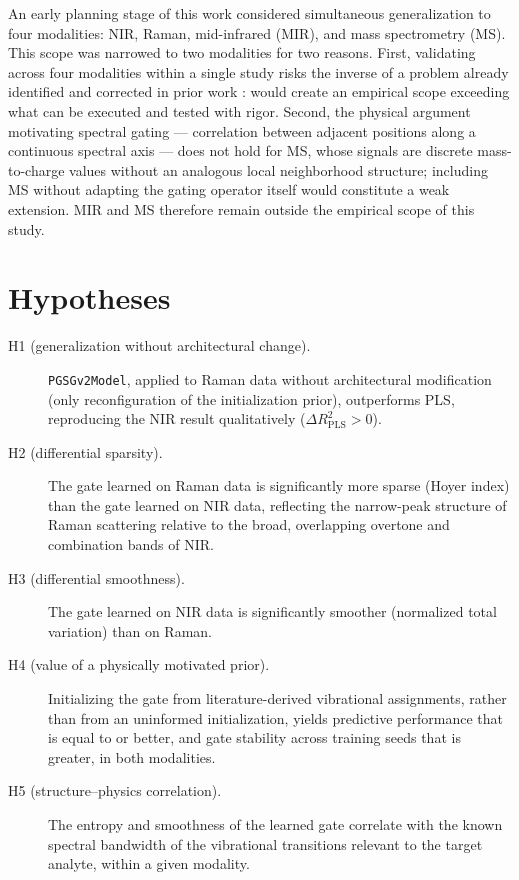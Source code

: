 \documentclass[preprint,12pt]{elsarticle}
\providecommand{\DIFaddtex}[1]{{\protect\color{blue} \sf #1}} %
\providecommand{\DIFdeltex}[1]{{\protect\color{red} \scriptsize #1}} %
\providecommand{\DIFaddbegin}{} %
\providecommand{\DIFaddend}{} %
\providecommand{\DIFdelbegin}{} %
\providecommand{\DIFdelend}{} %
\providecommand{\DIFadd}[1]{\texorpdfstring{\DIFaddtex{#1}}{#1}} %
\providecommand{\DIFdel}[1]{\texorpdfstring{\DIFdeltex{#1}}{}} %
\providecommand{\DIFscaledelfig}{0.5}
\newlength{\DIFdelgraphicswidth} %
\newlength{\DIFdelgraphicsheight} %
\providecommand{\DIFaddincludegraphics}[2][]{{\color{blue}\fbox{\DIFOincludegraphics[#1]{#2}}}} %
\providecommand{\DIFdelincludegraphics}[2][]{%
\sbox{\DIFdelgraphicsbox}{\DIFOincludegraphics[#1]{#2}}%
\settoboxwidth{\DIFdelgraphicswidth}{\DIFdelgraphicsbox} %
\settoboxtotalheight{\DIFdelgraphicsheight}{\DIFdelgraphicsbox} %
\scalebox{\DIFscaledelfig}{%
\parbox[b]{\DIFdelgraphicswidth}{\usebox{\DIFdelgraphicsbox}\\[-\baselineskip] \rule{\DIFdelgraphicswidth}{0em}}\llap{\resizebox{\DIFdelgraphicswidth}{\DIFdelgraphicsheight}{%
\setlength{\unitlength}{\DIFdelgraphicswidth}%
\begin{picture}(1,1)%
\thicklines\linethickness{2pt} %
{\color[rgb]{1,0,0}\put(0,0){\framebox(1,1){}}}%
{\color[rgb]{1,0,0}\put(0,0){\line( 1,1){1}}}%
{\color[rgb]{1,0,0}\put(0,1){\line(1,-1){1}}}%
\end{picture}%
}\hspace*{3pt}}} %
} %
\DeclareRobustCommand{\DIFaddbegin}{\DIFOaddbegin \let\includegraphics\DIFaddincludegraphics} %
\DeclareRobustCommand{\DIFaddend}{\DIFOaddend \let\includegraphics\DIFOincludegraphics} %
\DeclareRobustCommand{\DIFdelbegin}{\DIFOdelbegin \let\includegraphics\DIFdelincludegraphics} %
\DeclareRobustCommand{\DIFdelend}{\DIFOaddend \let\includegraphics\DIFOincludegraphics} %
\begin{document}
An early planning stage of this work considered simultaneous generalization to four modalities: NIR, Raman, mid-infrared (MIR), and mass spectrometry (MS). This scope was narrowed to two modalities for two reasons. First, validating across four modalities within a single study \DIFdelbegin \DIFdel{risks the inverse of a problem already identified and corrected in prior work \cite{coelho_pgsg1}: }\DIFdelend \DIFaddbegin \DIFadd{would create }\DIFaddend an empirical scope exceeding what can be executed and tested with rigor. Second, the physical argument motivating spectral gating --- correlation between adjacent positions along a continuous spectral axis --- does not hold for MS, whose signals are discrete mass-to-charge values without an analogous local neighborhood structure; including MS without adapting the gating operator itself would constitute a weak extension. MIR and MS therefore remain outside the empirical scope of this study.

\section{Hypotheses}
\label{sec:hypotheses}

\begin{description}
\item[H1 (generalization without architectural change).] \texttt{PGSGv2Model}, applied to Raman data without architectural modification (only reconfiguration of the initialization prior), outperforms PLS, reproducing the NIR result qualitatively ($\Delta R^{2}_{\mathrm{PLS}}>0$).
\item[H2 (differential sparsity).] The gate learned on Raman data is significantly more sparse (Hoyer index) than the gate learned on NIR data, reflecting the narrow-peak structure of Raman scattering relative to the broad, overlapping overtone and combination bands of NIR.
\item[H3 (differential smoothness).] The gate learned on NIR data is significantly smoother (normalized total variation) than on Raman.
\item[H4 (value of a physically motivated prior).] Initializing the gate from literature-derived vibrational assignments, rather than from an uninformed initialization, yields predictive performance that is equal to or better, and gate stability across training seeds that is greater, in both modalities.
\item[H5 (structure--physics correlation).] The entropy and smoothness of the learned gate correlate with the known spectral bandwidth of the vibrational transitions relevant to the target analyte, within a given modality.
\end{description}
\end{document}
